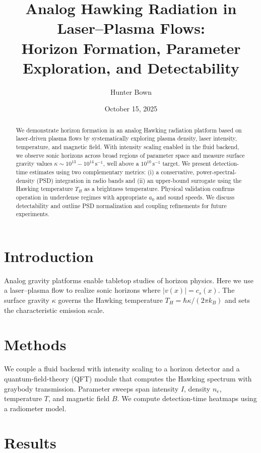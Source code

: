 \documentclass[11pt]{article}
\title{Analog Hawking Radiation in Laser--Plasma Flows:\\Horizon Formation, Parameter Exploration, and Detectability}
\author{Hunter Bown}
\date{October 15, 2025}
\begin{document}
\maketitle

\begin{abstract}
We demonstrate horizon formation in an analog Hawking radiation platform based on laser-driven plasma flows by systematically exploring plasma density, laser intensity, temperature, and magnetic field. With intensity scaling enabled in the fluid backend, we observe sonic horizons across broad regions of parameter space and measure surface gravity values $\kappa \sim 10^{13}{-}10^{14}\,\mathrm{s^{-1}}$, well above a $10^{10}\,\mathrm{s^{-1}}$ target. We present detection-time estimates using two complementary metrics: (i) a conservative, power-spectral-density (PSD) integration in radio bands and (ii) an upper-bound surrogate using the Hawking temperature $T_H$ as a brightness temperature. Physical validation confirms operation in underdense regimes with appropriate $a_0$ and sound speeds. We discuss detectability and outline PSD normalization and coupling refinements for future experiments.
\end{abstract}

\section{Introduction}
Analog gravity platforms enable tabletop studies of horizon physics. Here we use a laser--plasma flow to realize sonic horizons where $|v(x)| = c_s(x)$. The surface gravity $\kappa$ governs the Hawking temperature $T_H = \hbar \kappa/(2\pi k_B)$ and sets the characteristic emission scale.

\section{Methods}
We couple a fluid backend with intensity scaling to a horizon detector and a quantum-field-theory (QFT) module that computes the Hawking spectrum with graybody transmission. Parameter sweeps span intensity $I$, density $n_e$, temperature $T$, and magnetic field $B$. We compute detection-time heatmaps using a radiometer model.

\section{Results}
\end{document}
